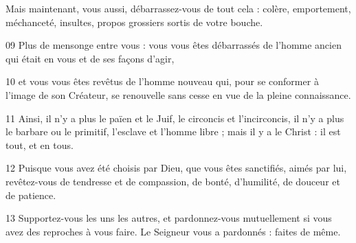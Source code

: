 Mais maintenant, vous aussi, débarrassez-vous de tout cela : colère, emportement, méchanceté, insultes, propos grossiers sortis de votre bouche.

09 Plus de mensonge entre vous : vous vous êtes débarrassés de l’homme ancien qui était en vous et de ses façons d’agir,

10 et vous vous êtes revêtus de l’homme nouveau qui, pour se conformer à l’image de son Créateur, se renouvelle sans cesse en vue de la pleine connaissance.

11 Ainsi, il n’y a plus le païen et le Juif, le circoncis et l’incirconcis, il n’y a plus le barbare ou le primitif, l’esclave et l’homme libre ; mais il y a le Christ : il est tout, et en tous.

12 Puisque vous avez été choisis par Dieu, que vous êtes sanctifiés, aimés par lui, revêtez-vous de tendresse et de compassion, de bonté, d’humilité, de douceur et de patience.

13 Supportez-vous les uns les autres, et pardonnez-vous mutuellement si vous avez des reproches à vous faire. Le Seigneur vous a pardonnés : faites de même.
